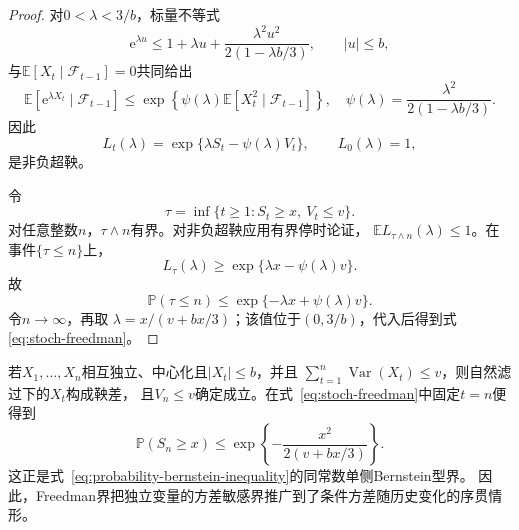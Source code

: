 \begin{proof}
对$0<\lambda<3/b$，标量不等式
\[
  \mathrm{e}^{\lambda u}
  \leq
  1+\lambda u+
  \frac{\lambda^2u^2}{2(1-\lambda b/3)},
  \qquad |u|\leq b,
  \]
与$\mathbb{E}[X_t\mid\mathcal{F}_{t-1}]=0$共同给出
\[
  \mathbb{E}[
    \mathrm{e}^{\lambda X_t}
    \mid\mathcal{F}_{t-1}]
  \leq
  \exp\left\{
    \psi(\lambda)
    \mathbb{E}[X_t^2\mid\mathcal{F}_{t-1}]
  \right\},
  \quad
  \psi(\lambda)=
  \frac{\lambda^2}{2(1-\lambda b/3)}.
\]
因此
\[
  L_t(\lambda)
  =
  \exp\{\lambda S_t-\psi(\lambda)V_t\},
  \qquad L_0(\lambda)=1,
\]
是非负超鞅。

令
\[
  \tau
  =
  \inf\{t\geq1:S_t\geq x,\ V_t\leq v\}.
  \]
对任意整数$n$，$\tau\wedge n$有界。对非负超鞅应用有界停时论证，
$\mathbb{E}L_{\tau\wedge n}(\lambda)\leq1$。在事件$\{\tau\leq n\}$上，
  \[
  L_\tau(\lambda)\geq\exp\{\lambda x-\psi(\lambda)v\}.
  \]
故
\[
  \mathbb{P}(\tau\leq n)\leq\exp\{-\lambda x+\psi(\lambda)v\}.
  \]
令$n\to\infty$，再取
$\lambda=x/(v+bx/3)$；该值位于$(0,3/b)$，代入后得到式
\eqref{eq:stoch-freedman}。
\end{proof}

若$X_1,\ldots,X_n$相互独立、中心化且$|X_t|\leq b$，并且
$\sum_{t=1}^{n}\operatorname{Var}(X_t)\leq v$，则自然滤过下的$X_t$构成鞅差，
且$V_n\leq v$确定成立。在式~\eqref{eq:stoch-freedman}中固定$t=n$便得到
\[
  \mathbb{P}(S_n\geq x)
  \leq
  \exp\left\{
    -\frac{x^2}{2(v+bx/3)}
  \right\}.
\]
这正是式~\eqref{eq:probability-bernstein-inequality}的同常数单侧Bernstein型界。
因此，Freedman界把独立变量的方差敏感界推广到了条件方差随历史变化的序贯情形。

